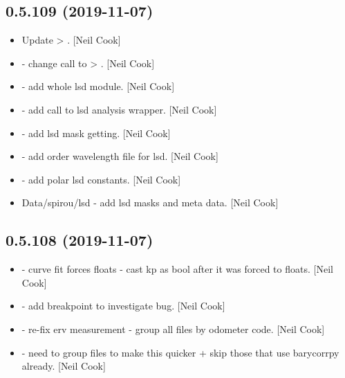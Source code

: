 \documentclass[a4paper,10pt,english]{report}
\begin{document}
\subsection{0.5.109 (2019-11-07)}
\label{\detokenize{misc/changelog:id33}}\begin{itemize}
\item {} 
Update  \textendash{}\textgreater{} . {[}Neil Cook{]}

\item {} 
 - change call to 
\textendash{}\textgreater{} . {[}Neil Cook{]}

\item {} 
 - add whole lsd module. {[}Neil Cook{]}

\item {} 
 - add call to lsd analysis wrapper.
{[}Neil Cook{]}

\item {} 
 - add lsd mask getting. {[}Neil Cook{]}

\item {} 
 - add order wavelength file for
lsd. {[}Neil Cook{]}

\item {} 
 - add polar lsd constants.
{[}Neil Cook{]}

\item {} 
Data/spirou/lsd - add lsd masks and meta data. {[}Neil Cook{]}

\end{itemize}


\subsection{0.5.108 (2019-11-07)}
\label{\detokenize{misc/changelog:id34}}\begin{itemize}
\item {} 
 - curve fit forces floats - cast kp as
bool after it was forced to floats. {[}Neil Cook{]}

\item {} 
 - add breakpoint to investigate bug. {[}Neil
Cook{]}

\item {} 
 - re-fix erv measurement - group all
files by odometer code. {[}Neil Cook{]}

\item {} 
 - need to group files to make this
quicker + skip those that use barycorrpy already. {[}Neil Cook{]}

\end{itemize}
\end{document}
